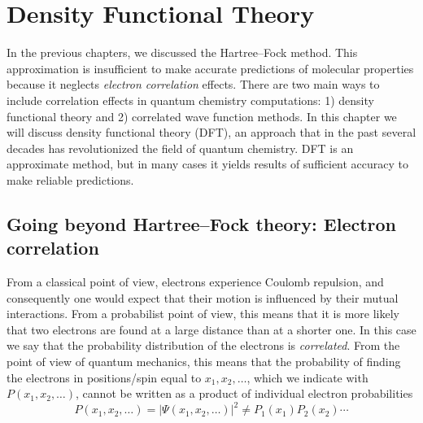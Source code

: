 \documentclass[../Main/chem371-notes.tex]{subfiles}
\begin{document}
\chapter{Density Functional Theory}

In the previous chapters, we discussed the Hartree--Fock method.
This approximation is insufficient to make accurate predictions of molecular properties because it neglects \emph{electron correlation} effects.
There are two main ways to include correlation effects in quantum chemistry computations: 1) density functional theory and 2) correlated wave function methods.
In this chapter we will discuss density functional theory (DFT), an approach that in the past several decades has revolutionized the field of quantum chemistry.
DFT is an approximate method, but in many cases it yields results of sufficient accuracy to make reliable predictions.

\section{Going beyond Hartree--Fock theory: Electron correlation}


From a classical point of view, electrons experience Coulomb repulsion, and consequently one would expect that their motion is influenced by their mutual interactions.
From a probabilist point of view, this means that it is more likely that two electrons are found at a large distance than at a shorter one.
In this case we say that the probability distribution of the electrons is \emph{correlated}.
From the point of view of quantum mechanics, this means that the probability of finding the electrons in positions/spin equal to $x_1, x_2, \ldots$, which we indicate with $P(x_1,x_2, \ldots)$, cannot be written as a product of individual electron probabilities
\begin{equation}
P(x_1,x_2, \ldots) = |\Psi(x_1,x_2, \ldots)|^2
\neq P_1(x_1) P_2(x_2) \cdots
\end{equation}
\end{document}
